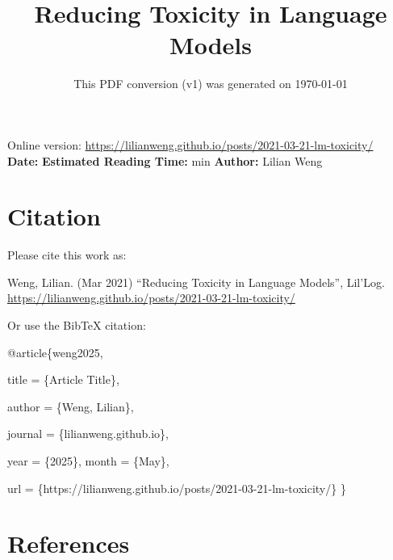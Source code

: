 \documentclass[12pt]{article}
\title{Reducing Toxicity in Language Models}
\date{This PDF conversion (v1) was generated on \today\footnotemark}
\begin{document}
\maketitle
\begin{center}
    Online version: \url{https://lilianweng.github.io/posts/2021-03-21-lm-toxicity/} \\
    \textbf{Date:} \quad
    \textbf{Estimated Reading Time:}  min \quad
    \textbf{Author:} Lilian Weng
\end{center}




\newpage
\tableofcontents
\newpage
\vspace{1em}
\n\n\n\section{Citation}
Please cite this work as:

\begin{tcolorbox}[colback=black!5!white, colframe=black!80!white, boxrule=0.5pt, arc=2mm, left=1mm, right=1mm, top=1mm, bottom=1mm]
  Weng, Lilian. (Mar 2021) ``Reducing Toxicity in Language Models'', Lil'Log. \url{https://lilianweng.github.io/posts/2021-03-21-lm-toxicity/}
  \end{tcolorbox}

Or use the BibTeX citation:

\begin{tcolorbox}[
    colback=black!5!white,
    colframe=black!80!white,
    boxrule=0.5pt,
    arc=2mm,
    left=1mm,
    right=1mm,
    top=1mm,
    bottom=1mm,
    listing only,
    listing options={
      basicstyle=\ttfamily\footnotesize,
      breaklines=true,
      literate={\{}{{\char`\{}}1 {\}}{{\char`\}}}1
    }
  ]
  @article\{weng2025,

    title   = \{Article Title\},

    author  = \{Weng, Lilian\},

    journal = \{lilianweng.github.io\},

    year    = \{2025\},
    month   = \{May\},

    url     = \{https://lilianweng.github.io/posts/2021-03-21-lm-toxicity/\}\n
  \}
  \end{tcolorbox}

\newpage
\section{References}

\n
\end{document}
